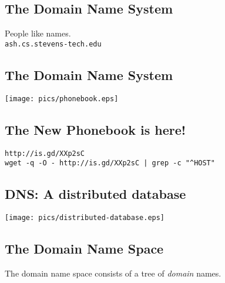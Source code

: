 \documentclass[xga]{xdvislides}
\begin{document}
\subsection{The Domain Name System}
\vspace{.5in}
\begin{center}
	\Huge
	People like names. \\
\vspace{.5in}
\verb+ash.cs.stevens-tech.edu+
\end{center}
\Normalsize


\subsection{The Domain Name System}
\vspace*{\fill}
\begin{center}
	\texttt{[image: pics/phonebook.eps]}
\end{center}
\vspace*{\fill}

\subsection{The New Phonebook is here!}
\vspace*{\fill}
\begin{center}
	\verb+http://is.gd/XXp2sC+ \\
	\addvspace{.5in}
	\verb+wget -q -O - http://is.gd/XXp2sC | grep -c "^HOST"+
\end{center}
\vspace*{\fill}

\subsection{DNS: A distributed database}
\vspace*{\fill}
\begin{center}
	\texttt{[image: pics/distributed-database.eps]}
\end{center}
\vspace*{\fill}

\subsection{The Domain Name Space}
\vspace{.5in}
\begin{center}
	\Huge
	The domain name space consists of a tree of {\em domain} names.
\end{center}
\Normalsize
\end{document}
